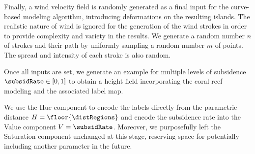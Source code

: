 
Finally, a wind velocity field is randomly generated as a final input for the curve-based modeling algorithm, introducing deformations on the resulting islands. The realistic nature of wind is ignored for the generation of the wind strokes in order to provide complexity and variety in the results. 
We generate a random number $n$ of strokes and their path by uniformly sampling a random number $m$ of points. The spread and intensity of each stroke is also random.

Once all inputs are set, we generate an example for multiple levels of subsidence $\subsidRate \in [0, 1]$ to obtain a height field incorporating the coral reef modeling and the associated label map. %


We use the Hue component to encode the labels directly from the parametric distance $H = \floor{\distRegions}$ and encode the subsidence rate into the Value component $V =\subsidRate$. %
%
Moreover, we purposefully left the Saturation component unchanged at this stage, reserving space for potentially including another parameter in the future. %

